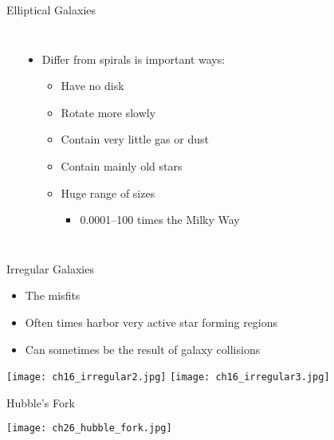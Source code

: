 \documentclass[pdf, aspectratio=169]{beamer}
\begin{document}
\begin{frame}{Elliptical Galaxies}
  \begin{columns}
	\begin{center}
	  \vspace{-6mm}
	\end{center}
	\begin{itemize}
	  \item Differ from spirals is important ways:
		\begin{itemize}
		  \item Have no disk
		  \item Rotate more slowly
		  \item Contain very little gas or dust
		  \item Contain mainly old stars
		  \item Huge range of sizes
			\begin{itemize}
			  \item 0.0001--100 times the Milky Way
			\end{itemize}
		\end{itemize}
	\end{itemize}
  \end{columns}
\end{frame}

\begin{frame}{Irregular Galaxies}
  \begin{itemize}
	\item The misfits
	\item Often times harbor very active star forming regions
	\item Can sometimes be the result of galaxy collisions
  \end{itemize}
  \begin{center}
	\texttt{[image: ch16\_irregular2.jpg]}
	\texttt{[image: ch16\_irregular3.jpg]}
  \end{center}
\end{frame}

\begin{frame}{Hubble's Fork}
  \begin{center}
	\texttt{[image: ch26\_hubble\_fork.jpg]}
  \end{center}
\end{frame}
\end{document}
